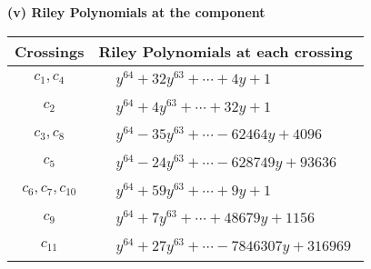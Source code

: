\documentclass[1p]{elsarticle_modified}
\theoremstyle{definition}
\begin{document}
\newpage\renewcommand{\arraystretch}{1}
\flushleft \textbf{(v) Riley Polynomials at the component}\newline \\
\begin{tabular}{m{50pt}|m{274pt}}
Crossings & \hspace{64pt}Riley Polynomials at each crossing \\
\hline $$\begin{aligned}c_{1},c_{4}\end{aligned}$$&$\begin{aligned}
&y^{64}+32 y^{63}+\cdots+4 y+1
\end{aligned}$\\
\hline $$\begin{aligned}c_{2}\end{aligned}$$&$\begin{aligned}
&y^{64}+4 y^{63}+\cdots+32 y+1
\end{aligned}$\\
\hline $$\begin{aligned}c_{3},c_{8}\end{aligned}$$&$\begin{aligned}
&y^{64}-35 y^{63}+\cdots-62464 y+4096
\end{aligned}$\\
\hline $$\begin{aligned}c_{5}\end{aligned}$$&$\begin{aligned}
&y^{64}-24 y^{63}+\cdots-628749 y+93636
\end{aligned}$\\
\hline $$\begin{aligned}c_{6},c_{7},c_{10}\end{aligned}$$&$\begin{aligned}
&y^{64}+59 y^{63}+\cdots+9 y+1
\end{aligned}$\\
\hline $$\begin{aligned}c_{9}\end{aligned}$$&$\begin{aligned}
&y^{64}+7 y^{63}+\cdots+48679 y+1156
\end{aligned}$\\
\hline $$\begin{aligned}c_{11}\end{aligned}$$&$\begin{aligned}
&y^{64}+27 y^{63}+\cdots-7846307 y+316969
\end{aligned}$\\
\hline
\end{tabular}\\~\\
\end{document}
